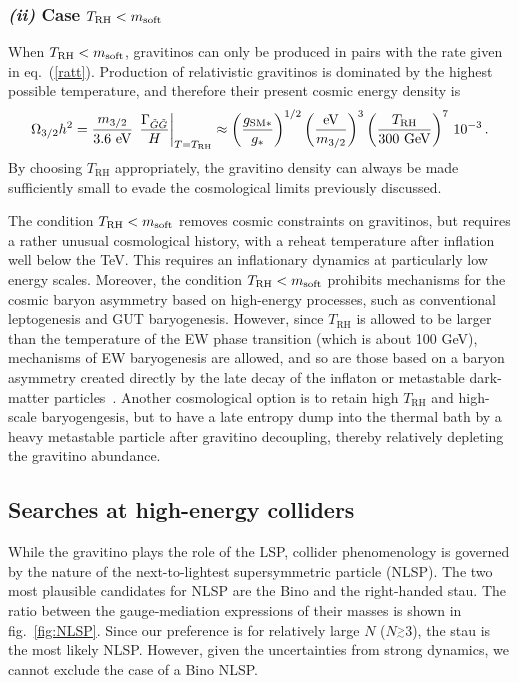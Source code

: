 \documentclass[a4paper,12pt]{article}
\newcommand{\gsim}{\stackrel{>}{_\sim}}
\newcommand{\beq}{\begin{equation}}
\newcommand{\eeq}{\end{equation}}
\def\eq#1{eq.~(\ref{#1})}
\def\fig#1{fig.~\ref{#1}}
\def\eq#1{eq.~(\ref{#1})}
\def\fig#1{fig.~\ref{#1}}
\def\msoft{m_{\rm soft}}
\def\mgra{m_{3/2}}
\def\TR{T_{\textrm{RH}}}
\def\gSM{g_{\textrm{SM}*}}
\begin{document}
{{{{\boldmath
\subsubsection*{\textit{(ii)} Case $\TR < \msoft$}
\unboldmath

When $\TR < \msoft$, gravitinos can only be produced in pairs with the rate given in \eq{ratt}. Production of relativistic gravitinos is dominated by the highest possible temperature, and therefore their present cosmic energy density is
\beq
 \Omega_{3/2} h^2 =\frac{\mgra}{3.6~{\rm eV}}\, 
 \left. \frac{\Gamma_{{\tilde G}{\tilde G}}}{H} \right|_{T=\TR} \approx
 \left( \frac{\gSM}{g_*} \right)^{1/2} \left( \frac{\rm eV}{\mgra} \right)^3 \left( \frac{\TR}{300~{\rm GeV}}\right)^7 \, 10^{-3}\, .
 \eeq
By choosing $\TR$ appropriately, the gravitino density can always be made sufficiently small to evade the cosmological limits previously discussed.

The condition $\TR < \msoft$ removes cosmic constraints on gravitinos, but requires a rather unusual cosmological history, with a reheat temperature after inflation well below the TeV. This requires an inflationary dynamics at particularly low energy scales. Moreover, the condition $\TR < \msoft$ prohibits  mechanisms for the cosmic baryon asymmetry based on high-energy processes, such as conventional leptogenesis and GUT baryogenesis. However, since $\TR$ is allowed to be larger than the temperature of the EW phase transition (which is about 100 GeV), mechanisms of EW baryogenesis are allowed, and so are those based on a baryon asymmetry created directly by the late decay of the inflaton or metastable dark-matter particles~\cite{Cui:2012jh,Cui:2015eba}. Another cosmological option is to retain high $\TR$ and high-scale baryogengesis, but to have a late entropy dump into the thermal bath by a heavy metastable particle after gravitino decoupling, thereby relatively depleting the gravitino abundance.

\subsection{Searches at high-energy colliders}
\label{sec:collider}

 While the gravitino plays the role of the LSP, collider phenomenology is governed by the nature of the next-to-lightest supersymmetric particle (NLSP). 
The two most plausible candidates for NLSP are the Bino and the right-handed stau. The ratio between the gauge-mediation expressions of their masses is shown in \fig{fig:NLSP}.
Since our preference is for relatively large $N$ ($N \gsim 3$), the stau is the most likely NLSP.
However, given the uncertainties from strong dynamics, we cannot exclude the case of a Bino NLSP.

}}}}
\end{document}
